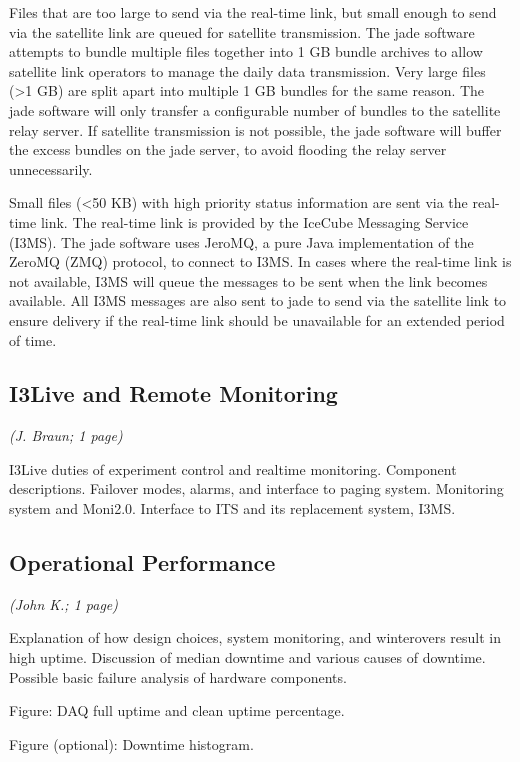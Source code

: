 Files that are too large to send via the real-time link, but small enough to send via the satellite link are queued for satellite transmission. The jade software
attempts to bundle multiple files together into 1 GB bundle archives to allow satellite link operators to manage the daily data transmission. Very large files
(>1 GB) are split apart into multiple 1 GB bundles for the same reason. The jade software will only transfer a configurable number of bundles to the satellite
relay server. If satellite transmission is not possible, the jade software will buffer the excess bundles on the jade server, to avoid flooding the relay server
unnecessarily.


Small files (<50 KB) with high priority status information are sent via the real-time link. The real-time link is provided by the IceCube Messaging Service
(I3MS). The jade software uses JeroMQ, a pure Java implementation of the ZeroMQ (ZMQ) protocol, to connect to I3MS. In cases where the real-time link is not
available, I3MS will queue the messages to be sent when the link becomes available. All I3MS messages are also sent to jade to send via the satellite link to
ensure delivery if the real-time link should be unavailable for an extended period of time.

\subsection{I3Live and Remote Monitoring}
\textsl{(J. Braun; 1 page)}

I3Live duties of experiment control and realtime monitoring.  Component
descriptions.  Failover modes, alarms, and interface to paging system.
Monitoring system and Moni2.0.  Interface to ITS and its replacement
system, I3MS. 

\subsection{Operational Performance}
\textsl{(John K.; 1 page)}

Explanation of how design choices, system monitoring, and winterovers result in
high uptime.  Discussion of median downtime and various causes of downtime.
Possible basic failure analysis of hardware components.  

Figure: DAQ full uptime and clean uptime percentage.

Figure (optional): Downtime histogram.  
